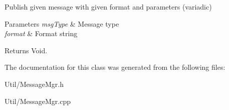 Publish given message with given format and parameters (variadic) 


\begin{DoxyParams}{Parameters}
{\em msg\+Type} & Message type \\
\hline
{\em format} & Format string \\
\hline
\end{DoxyParams}
\begin{DoxyReturn}{Returns}
Void. 
\end{DoxyReturn}


The documentation for this class was generated from the following files\+:\begin{DoxyCompactItemize}
\item 
Util/Message\+Mgr.\+h\item 
Util/Message\+Mgr.\+cpp\end{DoxyCompactItemize}
